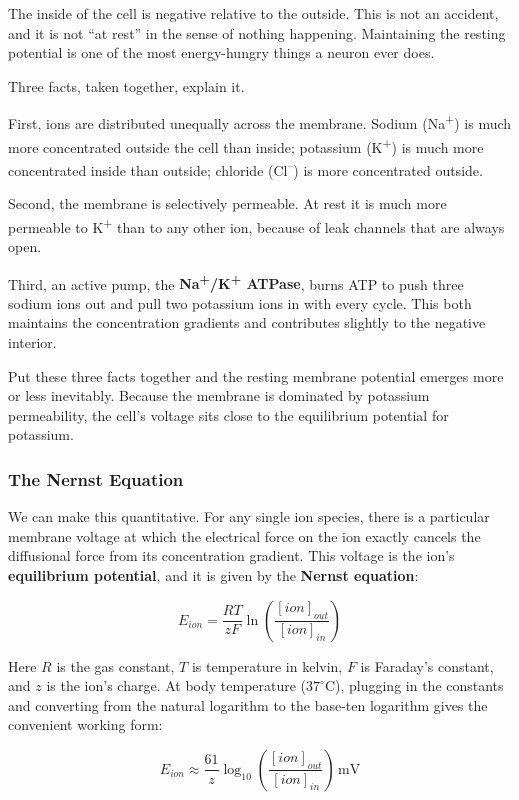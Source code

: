 \documentclass[11pt]{article}
\begin{document}
The inside of the cell is negative relative to the outside. This is not an accident, and it is not ``at rest'' in the sense of nothing happening. Maintaining the resting potential is one of the most energy-hungry things a neuron ever does.

Three facts, taken together, explain it.

First, ions are distributed unequally across the membrane. Sodium (Na\textsuperscript{+}) is much more concentrated outside the cell than inside; potassium (K\textsuperscript{+}) is much more concentrated inside than outside; chloride (Cl\textsuperscript{--}) is more concentrated outside.

Second, the membrane is selectively permeable. At rest it is much more permeable to K\textsuperscript{+} than to any other ion, because of leak channels that are always open.

Third, an active pump, the \textbf{Na\textsuperscript{+}/K\textsuperscript{+} ATPase}, burns ATP to push three sodium ions out and pull two potassium ions in with every cycle. This both maintains the concentration gradients and contributes slightly to the negative interior.

Put these three facts together and the resting membrane potential emerges more or less inevitably. Because the membrane is dominated by potassium permeability, the cell's voltage sits close to the equilibrium potential for potassium.

\subsubsection{The Nernst Equation}

We can make this quantitative. For any single ion species, there is a particular membrane voltage at which the electrical force on the ion exactly cancels the diffusional force from its concentration gradient. This voltage is the ion's \textbf{equilibrium potential}, and it is given by the \textbf{Nernst equation}:

\[
E_{ion} = \frac{RT}{zF} \ln\!\left(\frac{[ion]_{out}}{[ion]_{in}}\right)
\]

Here $R$ is the gas constant, $T$ is temperature in kelvin, $F$ is Faraday's constant, and $z$ is the ion's charge. At body temperature ($37^\circ$C), plugging in the constants and converting from the natural logarithm to the base-ten logarithm gives the convenient working form:

\[
E_{ion} \approx \frac{61}{z} \log_{10}\!\left(\frac{[ion]_{out}}{[ion]_{in}}\right) \, \text{mV}
\]
\end{document}
